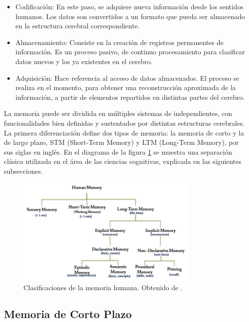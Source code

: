 \begin{itemize}
\item Codificaci\'on: En este paso, se adquiere nueva informaci\'on desde los sentidos humanos. Los datos son convertidos a un formato que pueda ser almacenado en la estructura cerebral correspondiente.
\item Almacenamiento: Consiste en la creaci\'on de registros permanentes de informaci\'on. Es un proceso pasivo, de continuo procesamiento para clasificar datos nuevos y los ya existentes en el cerebro.
\item Adquisici\'on: Hace referencia al acceso de datos almacenados. El proceso se realiza en el momento, para obtener una reconstrucci\'on aproximada de la informaci\'on, a partir de elementos repartidos en distintas partes del cerebro.
\end{itemize}


La memoria puede ser dividida en m\'ultiples sistemas de independientes, con funcionalidades bien definidas y sustentados por distintas estructuras cerebrales. La primera diferenciaci\'on define dos tipos de memoria: la memoria de corto y la de largo plazo, STM (Short-Term Memory) y LTM (Long-Term Memory), por sus siglas en ingl\'es. En el diagrama de la figura \ref{img:human_memory} se muestra una separaci\'on cl\'asica utilizada en el \'area de las ciencias cognitivas\cite{Eichenbaum:2008}, explicada en las siguientes subsecciones.

\begin{figure}[H]
\centering
\includegraphics[width=0.8\textwidth]{./figures/diagrama_memoria.png}
\caption{\small Clasificaciones de la memoria humana. Obtenido de \cite{Vijayakumar2014}.}
\label{img:human_memory}
\end{figure}


\subsection{Memoria de Corto Plazo}


